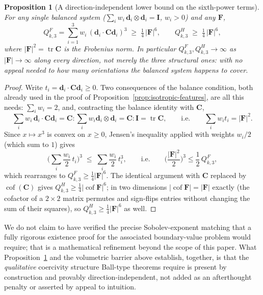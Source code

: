\documentclass[10pt,a4paper]{article}
\newtheorem{proposition}{Proposition}
\newcommand{\Cof}{\operatorname{cof}}
\newcommand{\tr}{\operatorname{tr}}
\begin{document}
\begin{proposition}[A direction-independent lower bound on the sixth-power terms]
\label{prop:sixth-power-bound}
For any single balanced system ($\sum_iw_i\,\bm d_i\otimes \bm d_i=\bm I$, $w_i>0$)
and any $\bm F$,
\begin{equation}
 Q_{k,3}^F=\sum_{i=1}^3w_i\,(\bm d_i\cdot \bm C\bm d_i)^3\;\geq\;\tfrac14\,|\bm F|^6,
 \qquad
 Q_{k,3}^H\;\geq\;\tfrac14\,|\bm F|^6,
 \label{eq:sixth-power-bound}
\end{equation}
where $|\bm F|^2=\tr \bm C$ is the Frobenius norm. In particular
$Q_{k,3}^F,Q_{k,3}^H\to\infty$ as $|\bm F|\to\infty$ along \emph{every}
direction, not merely the three structural ones: with no appeal
needed to how many orientations the balanced system happens to cover.
\end{proposition}
\begin{proof}
Write $t_i=\bm d_i\cdot \bm C\bm d_i\geq0$. Two consequences of the balance
condition, both already used in the proof of
Proposition~\ref{prop:isotropic-features}, are all this needs:
$\sum_iw_i=2$, and, contracting the balance identity with $\bm C$,
\begin{equation}
 \sum_iw_i\,\bm d_i\cdot \bm C\bm d_i=\bm C:\sum_iw_i\bm d_i\otimes \bm d_i=\bm C:\bm I=\tr \bm C,
 \qquad\text{i.e.}\qquad
 \sum_iw_it_i=|\bm F|^2.
\end{equation}
Since $x\mapsto x^3$ is convex on $x\geq0$, Jensen's
inequality applied with weights $w_i/2$ (which sum to $1$) gives
\begin{equation}
 \Big(\sum_i\frac{w_i}2\,t_i\Big)^{\!3}\;\leq\;\sum_i\frac{w_i}2\,t_i^3,
 \qquad\text{i.e.}\qquad
 \Big(\frac{|\bm F|^2}2\Big)^{\!3}\leq\frac12\,Q_{k,3}^F,
\end{equation}
which rearranges to $Q_{k,3}^F\geq\tfrac14|\bm F|^6$. The identical
argument with $\bm C$ replaced by $\Cof(\bm C)$ gives $Q_{k,3}^H\geq\tfrac14
|\Cof \bm F|^6$; in two dimensions $|\Cof \bm F|=|\bm F|$ exactly (the cofactor of
a $2\times2$ matrix permutes and sign-flips entries without changing
the sum of their squares), so $Q_{k,3}^H\geq\tfrac14|\bm F|^6$ as well.
\end{proof}

We do not claim to have verified the precise Sobolev-exponent matching
that a fully rigorous existence proof for the associated boundary-value
problem would require; that is a mathematical refinement beyond the scope
of this paper. What Proposition~\ref{prop:sixth-power-bound} and the
volumetric barrier above establish, together, is that the
\emph{qualitative} coercivity structure Ball-type theorems require is
present by construction and provably direction-independent, not added
as an afterthought penalty or asserted by appeal to intuition.
\end{document}
